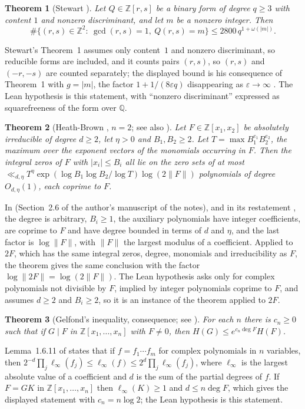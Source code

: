 \documentclass[11pt,reqno]{amsart}
\newtheorem{theorem}{Theorem}[section]
\theoremstyle{definition}
\theoremstyle{remark}
\numberwithin{equation}{section}
\newcommand{\Z}{\mathbb Z}
\newcommand{\Q}{\mathbb Q}
\begin{document}
\begin{theorem}[{Stewart \cite[p.~796, consequence of Theorem~1]{Stewart}}]\label{thm:stewart}
Let $Q\in\Z[r,s]$ be a binary form of degree $q\ge3$ with content $1$ and
nonzero discriminant, and let $m$ be a nonzero integer. Then
\[
\#\{(r,s)\in\Z^2:\ \gcd(r,s)=1,\ Q(r,s)=m\}\le 2800\,q^{1+\omega(|m|)}.
\]
\end{theorem}
Stewart's Theorem~1 assumes only content~$1$ and nonzero discriminant, so
reducible forms are included, and it counts pairs $(r,s)$, so $(r,s)$ and
$(-r,-s)$ are counted separately; the displayed bound is his consequence of
Theorem~1 with $g=|m|$, the factor $1+1/(8\varepsilon q)$ disappearing as
$\varepsilon\to\infty$ \cite[pp.~795--796]{Stewart}. The Lean hypothesis is
this statement, with ``nonzero discriminant'' expressed as squarefreeness of
the form over $\Q$.

\begin{theorem}[{Heath-Brown \cite[Theorem~15]{HBLNM}, $n=2$; see also \cite[Theorem~2]{ReussThesis}}]\label{thm:hb15}
Let $F\in\Z[x_1,x_2]$ be absolutely irreducible of degree $d\ge2$, let
$\eta>0$ and $B_1,B_2\ge2$. Let $T=\max B_1^{e_1}B_2^{e_2}$, the maximum
over the exponent vectors of the monomials occurring in $F$. Then the integral
zeros of $F$ with $|x_i|\le B_i$ all lie on the zero sets of at most
$\ll_{d,\eta}T^{\eta}\exp(\log B_1\log B_2/\log T)\log(2\|F\|)$
polynomials of degree $O_{d,\eta}(1)$, each coprime to $F$.
\end{theorem}
In \cite[Theorem~15]{HBLNM} (Section~2.6 of the author's manuscript of the
notes), and in its restatement \cite[Theorem~2]{ReussThesis}, the degree is
arbitrary, $B_i\ge1$, the auxiliary polynomials have integer coefficients,
are coprime to $F$ and have degree bounded in terms of $d$ and $\eta$, and the
last factor is $\log\|F\|$, with $\|F\|$ the largest modulus of a coefficient.
Applied to $2F$, which has the same integral zeros, degree, monomials and
irreducibility as $F$, the theorem gives the same conclusion with the factor
$\log\|2F\|=\log(2\|F\|)$. The Lean hypothesis asks only for complex
polynomials not divisible by $F$, implied by integer polynomials coprime to
$F$, and assumes $d\ge2$ and $B_i\ge2$, so it is an instance of the theorem
applied to $2F$.

\begin{theorem}[{Gelfond's inequality, consequence; see \cite[Lemma~1.6.11]{BombieriGubler}}]\label{thm:gelfond}
For each $n$ there is $c_n\ge0$ such that if $G\mid F$ in $\Z[x_1,\dots,x_n]$
with $F\ne0$, then $H(G)\le e^{c_n\deg F}H(F)$.
\end{theorem}
Lemma~1.6.11 of \cite{BombieriGubler} states that if $f=f_1\cdots f_m$ for
complex polynomials in $n$ variables, then
$2^{-d}\prod_j\ell_\infty(f_j)\le\ell_\infty(f)\le2^d\prod_j\ell_\infty(f_j)$,
where $\ell_\infty$ is the largest absolute value of a coefficient and $d$ is
the sum of the partial degrees of $f$. If $F=GK$ in $\Z[x_1,\dots,x_n]$ then
$\ell_\infty(K)\ge1$ and $d\le n\deg F$, which gives the displayed statement
with $c_n=n\log2$; the Lean hypothesis is this statement.
\end{document}
